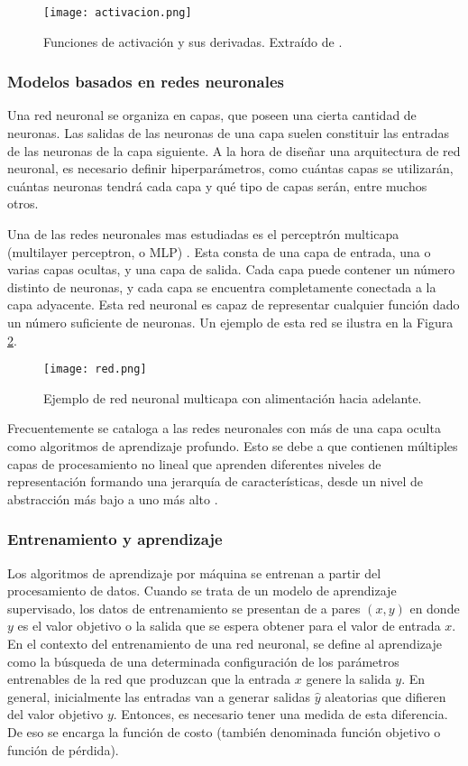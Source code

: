 \begin{figure}[H]
  \centering{}
  \texttt{[image: activacion.png]}
  \caption{Funciones de activación y sus derivadas. Extraído de \cite{lagartija}.}
  \label{fig:activación}
\end{figure}

\subsubsection{Modelos basados en redes neuronales}

Una red neuronal se organiza en capas, que poseen una cierta cantidad de neuronas. Las salidas de las neuronas de una capa suelen constituir las entradas de las neuronas de la capa siguiente. A la hora de diseñar una arquitectura de red neuronal, es necesario definir hiperparámetros, como cuántas capas se utilizarán, cuántas neuronas tendrá cada capa y qué tipo de capas serán, entre muchos otros.

Una de las redes neuronales mas estudiadas es el perceptrón multicapa (multilayer perceptron, o MLP) \cite{MLP}. Esta consta de una capa de entrada, una o varias capas ocultas, y una capa de salida. Cada capa puede contener un número distinto de neuronas, y cada capa se encuentra completamente conectada a la capa adyacente. Esta red neuronal es capaz de representar cualquier función dado un número suficiente de neuronas. Un ejemplo de esta red se ilustra en la Figura \ref{fig:red}.

\begin{figure}[H]
  \centering{}
  \texttt{[image: red.png]}
  \caption{Ejemplo de red neuronal multicapa con alimentación hacia adelante.}
  \label{fig:red}
\end{figure}

Frecuentemente se cataloga a las redes neuronales con más de una capa oculta como algoritmos de aprendizaje profundo. Esto se debe a que contienen múltiples capas de procesamiento no lineal que aprenden diferentes niveles de representación formando una jerarquía de características, desde un nivel de abstracción más bajo a uno más alto \cite{franchute}.  

\subsubsection{Entrenamiento y aprendizaje}

Los algoritmos de aprendizaje por máquina se entrenan a partir del procesamiento de datos. Cuando se trata de un modelo de aprendizaje supervisado, los datos de entrenamiento se presentan de a pares $(x,y)$ en donde $y$ es el valor objetivo o la salida que se espera obtener para el valor de entrada $x$. En el contexto del entrenamiento de una red neuronal, se define al aprendizaje como la búsqueda de una determinada configuración de los parámetros entrenables de la red que produzcan que la entrada $x$ genere la salida $y$. En general, inicialmente las entradas van a generar salidas $\hat{y}$ aleatorias que difieren del valor objetivo $y$. Entonces, es necesario tener una medida de esta diferencia. De eso se encarga la función de costo (también denominada función objetivo o función de pérdida).

